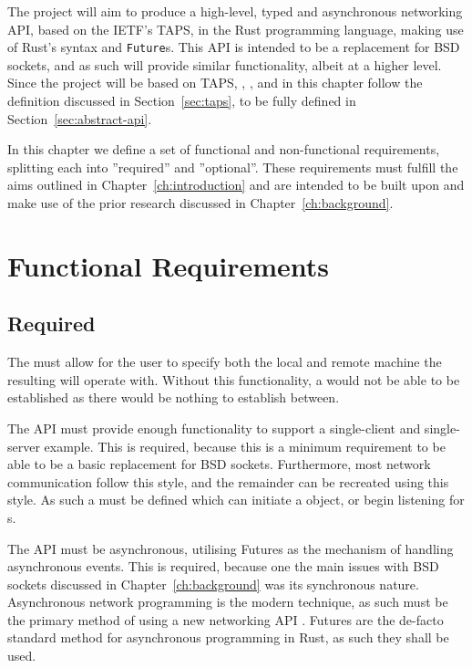 The project will aim to produce a high-level, typed and asynchronous networking API, based on the IETF's TAPS, in the
Rust programming language, making use of Rust's \asyncawait{} syntax and \texttt{Future}s.
This API is intended to be a replacement for BSD sockets, and as such will provide similar functionality, albeit at a
higher level.
Since the project will be based on TAPS, \preconnection{}, \framer{}, \listener{} and \connection{} in this chapter
follow the definition discussed in Section~\ref{sec:taps}, to be fully defined in Section~\ref{sec:abstract-api}.

In this chapter we define a set of functional and non-functional requirements, splitting each into ''required'' and
''optional''.
These requirements must fulfill the aims outlined in Chapter~\ref{ch:introduction} and are intended to be built upon and
make use of the prior research discussed in Chapter~\ref{ch:background}.

\section{Functional Requirements}\label{sec:functional-requirements}

\subsection{Required}\label{subsec:required}
The \preconnection{} must allow for the user to specify both the local and remote machine the resulting \connection{}
will operate with.
Without this functionality, a \connection{} would not be able to be established as there would be nothing to establish
between.

The API must provide enough functionality to support a single-client and single-server example.
This is required, because this is a minimum requirement to be able to be a basic replacement for BSD sockets.
Furthermore, most network communication follow this style, and the remainder can be recreated using this style.
As such a \preconnection{} must be defined which can initiate a \connection{} object, or begin listening for
\connection{}s.

The API must be asynchronous, utilising Futures as the mechanism of handling asynchronous events.
This is required, because one the main issues with BSD sockets discussed in Chapter~\ref{ch:background} was its
synchronous nature.
Asynchronous network programming is the modern technique, as such must be the primary method of using a new networking
API .
Futures are the de-facto standard method for asynchronous programming in Rust, as such they shall be used.

